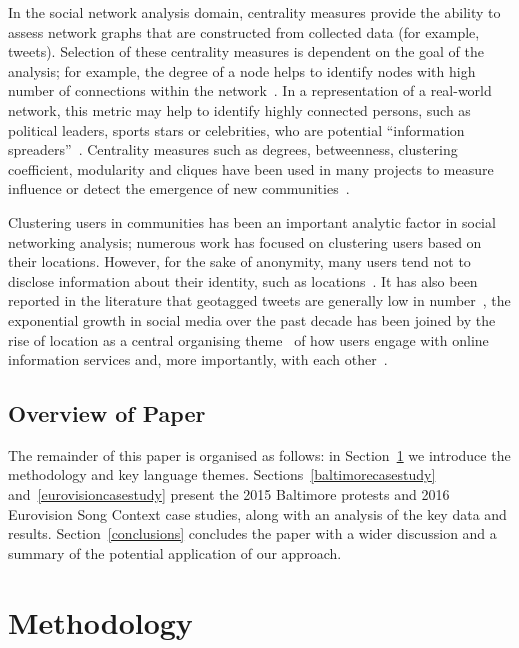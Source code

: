 \documentclass{llncs}
\begin{document}
In the social network analysis domain, centrality measures
provide the ability to assess network graphs that are constructed from
collected data (for example, tweets). Selection of these centrality
measures is dependent on the goal of the analysis; for example, the
degree of a node helps to identify nodes with high number of connections
within the
network~\cite{borgatti+everett:2000,rombach-et-al:2014,liu-et-al:2014}.
In a representation of a real-world network, this metric may help to
identify highly connected persons, such as political leaders, sports
stars or celebrities, who are potential ``information
spreaders''~\cite{cha-et-al:2012,borge-holthoefer-et-al:2012,zhang-et-al:2016}.
Centrality measures such as degrees, betweenness, clustering
coefficient, modularity and cliques have been used in many projects to
measure influence or detect the emergence of new
communities~\cite{willis-et-al:2015,oatley+crick:2015}.

Clustering users in communities has been an important analytic factor
in social networking analysis; numerous work has focused on clustering
users based on their locations. However, for the sake of anonymity,
many users tend not to disclose information about their identity, such
as locations~\cite{kang-et-al:2013}. It has also been reported in the
literature that geotagged tweets are generally low in
number~\cite{morstatter-et-al:2013,tan-et-al:2013,kumar-et-al:2014},
the exponential growth in social media over the past decade has been
joined by the rise of location as a central organising
theme~\cite{liang-et-al:2013} of how users engage with online
information services and, more importantly, with each
other~\cite{cheng-et-al:2010,caverlee-et-al:2013}.

\subsection{Overview of Paper}

The remainder of this paper is organised as follows: in
Section~\ref{method} we introduce the methodology and key
language themes.  Sections~\ref{baltimorecasestudy}
and~\ref{eurovisioncasestudy} present the 2015 Baltimore protests and
2016 Eurovision Song Context case studies, along with an analysis of
the key data and results. Section~\ref{conclusions} concludes the
paper with a wider discussion and a summary of the potential
application of our approach.


\section{Methodology}\label{method}
\end{document}
